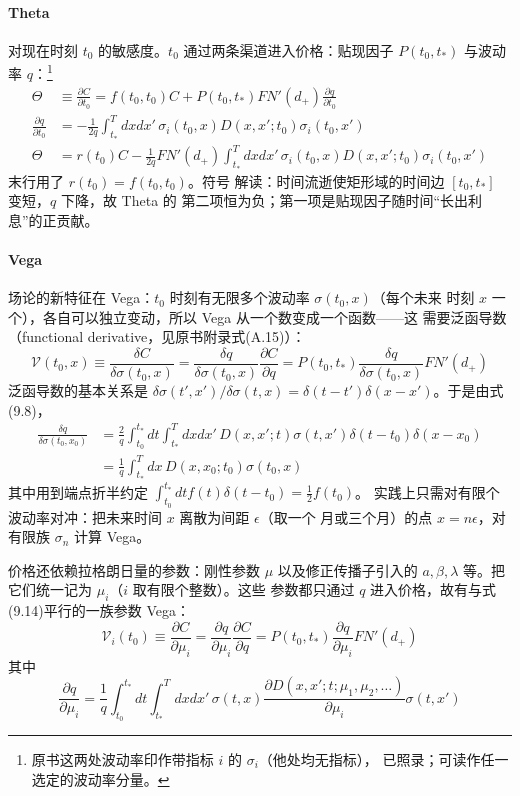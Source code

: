 \paragraph{Theta}
对现在时刻 $t_0$ 的敏感度。$t_0$ 通过两条渠道进入价格：贴现因子
$P(t_0,t_*)$ 与波动率 $q$：\footnote{原书这两处波动率印作带指标 $i$ 的 $\sigma_i$（他处均无指标），
已照录；可读作任一选定的波动率分量。}
\begin{align*}
\Theta&\equiv\frac{\partial C}{\partial t_0}
=f(t_0,t_0)C+P(t_0,t_*)FN'(d_{+})\frac{\partial q}{\partial t_0}\\
\frac{\partial q}{\partial t_0}
&=-\frac{1}{2q}\int_{t_*}^{T}dxdx'\,
\sigma_i(t_0,x)D(x,x';t_0)\sigma_i(t_0,x')\\
\Theta&=r(t_0)C-\frac{1}{2q}FN'(d_{+})\int_{t_*}^{T}dxdx'\,
\sigma_i(t_0,x)D(x,x';t_0)\sigma_i(t_0,x')
\end{align*}末行用了 $r(t_0)=f(t_0,t_0)$。符号
解读：时间流逝使矩形域的时间边 $[t_0,t_*]$ 变短，$q$ 下降，故 Theta 的
第二项恒为负；第一项是贴现因子随时间“长出利息”的正贡献。

\paragraph{Vega}
场论的新特征在 Vega：$t_0$ 时刻有无限多个波动率 $\sigma(t_0,x)$（每个未来
时刻 $x$ 一个），各自可以独立变动，所以 Vega 从一个数变成一个函数——这
需要泛函导数（functional derivative，见原书附录式(A.15)）：
\begin{equation*}
\mathcal{V}(t_0,x)\equiv\frac{\delta C}{\delta\sigma(t_0,x)}
=\frac{\delta q}{\delta\sigma(t_0,x)}\frac{\partial C}{\partial q}
=P(t_0,t_*)\frac{\delta q}{\delta\sigma(t_0,x)}FN'(d_{+})\tag{9.14}
\end{equation*}
泛函导数的基本关系是 $\delta\sigma(t',x')/\delta\sigma(t,x)
=\delta(t-t')\delta(x-x')$。于是由式(9.8)，
\begin{align*}
\frac{\delta q}{\delta\sigma(t_0,x_0)}
&=\frac{2}{q}\int_{t_0}^{t_*}dt\int_{t_*}^{T}dxdx'\,
D(x,x';t)\sigma(t,x')\delta(t-t_0)\delta(x-x_0)\\
&=\frac{1}{q}\int_{t_*}^{T}dx\,D(x,x_0;t_0)\sigma(t_0,x)
\end{align*}
其中用到端点折半约定 $\int_{t_0}^{t_*}dtf(t)\delta(t-t_0)=\frac{1}{2}f(t_0)$。
实践上只需对有限个波动率对冲：把未来时间 $x$ 离散为间距 $\epsilon$（取一个
月或三个月）的点 $x=n\epsilon$，对有限族 $\sigma_n$ 计算 Vega。

价格还依赖拉格朗日量的参数：刚性参数 $\mu$ 以及修正传播子引入的
$a,\beta,\lambda$ 等。把它们统一记为 $\mu_i$（$i$ 取有限个整数）。这些
参数都只通过 $q$ 进入价格，故有与式(9.14)平行的一族参数 Vega：
\begin{equation*}
\mathcal{V}_i(t_0)\equiv\frac{\partial C}{\partial\mu_i}
=\frac{\partial q}{\partial\mu_i}\frac{\partial C}{\partial q}
=P(t_0,t_*)\frac{\partial q}{\partial\mu_i}FN'(d_{+})\tag{9.15}
\end{equation*}
其中
\begin{equation*}
\frac{\partial q}{\partial\mu_i}=\frac{1}{q}\int_{t_0}^{t_*}dt
\int_{t_*}^{T}dxdx'\,\sigma(t,x)
\frac{\partial D(x,x';t;\mu_1,\mu_2,\dots)}{\partial\mu_i}\sigma(t,x')
\end{equation*}

